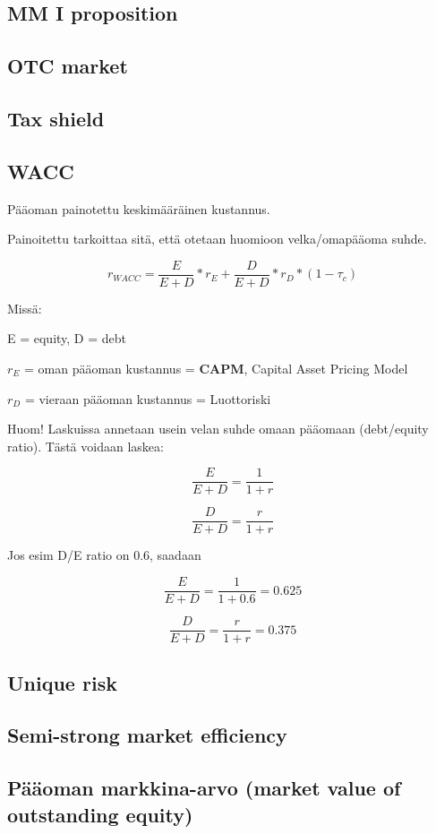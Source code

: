\documentclass[a4paper]{article}
\begin{document}
\subsection{MM I proposition}

\subsection{OTC market}

\subsection{Tax shield}

\subsection{WACC}

Pääoman painotettu keskimääräinen kustannus.

Painoitettu tarkoittaa sitä, että otetaan huomioon velka/omapääoma suhde.

\[
r_{WACC} = \frac{E}{E + D} * r_E + \frac{D}{E + D} * r_D * (1 - \tau_c)
\]

Missä: 

E = equity, D = debt

$r_E$ = oman pääoman kustannus = \textbf{CAPM}, Capital Asset Pricing Model

$r_D$ = vieraan pääoman kustannus = Luottoriski

Huom! Laskuissa annetaan usein velan suhde omaan pääomaan (debt/equity ratio). Tästä voidaan laskea:

\[
\frac{E}{E + D} = \frac{1}{1 +r}
\]

\[
\frac{D}{E + D} = \frac{r}{1 +r}
\]

Jos esim D/E ratio on 0.6, saadaan

\[
\frac{E}{E + D} = \frac{1}{1 + 0.6} = 0.625
\]

\[
\frac{D}{E + D} = \frac{r}{1 +r} = 0.375
\]

\subsection{Unique risk}

\subsection{Semi-strong market efficiency}

\subsection{Pääoman markkina-arvo (market value of outstanding equity)}
\end{document}

